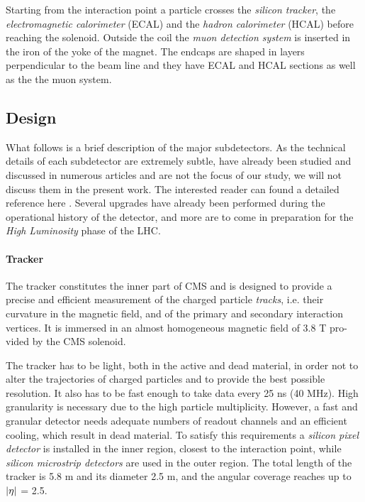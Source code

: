 Starting from the interaction point a particle crosses the\emph{ silicon tracker}, the \emph{electromagnetic calorimeter} (ECAL) and the \emph{hadron calorimeter} (HCAL) before reaching
the solenoid. Outside the coil the \emph{muon detection system} is inserted in the iron of the
yoke of the magnet. The endcaps are shaped in layers perpendicular to the beam
line and they have ECAL and HCAL sections as well as the the muon system.

\subsection{Design}

What follows is a brief description of the major subdetectors. As the technical details of each subdetector are extremely subtle, have already been studied and discussed in numerous articles and are not the focus of our study, we will not discuss them in the present work. The interested reader can found a detailed reference here \cite{Collaboration_2008}. Several upgrades have already been performed during the operational history of the detector, and more are to come in preparation for the \emph{High Luminosity} phase of the LHC.

\paragraph{Tracker}

The tracker constitutes the inner part of CMS and is designed to provide a precise
and efficient measurement of the charged particle \emph{tracks}, i.e. their curvature in the magnetic field, and of the primary and secondary
interaction vertices. It is immersed in an almost homogeneous magnetic field of 3.8 T pro-
vided by the CMS solenoid.

The tracker has to be light, both in the active and dead material, in order not to alter the
trajectories of charged particles and to provide the best possible resolution. It also has to
be fast enough to take data every 25 ns (40 MHz). High granularity is necessary due to the
high particle multiplicity. However, a fast and granular detector needs adequate numbers
of readout channels and an efficient cooling, which result in dead material.
To satisfy this requirements a \emph{silicon
pixel detector} is installed in the inner region, closest to the interaction point, while \emph{silicon
microstrip detectors} are used in the outer region. The total length of the tracker is 5.8 m
and its diameter 2.5 m, and the angular coverage reaches up to $\abs{\eta}$ = 2.5. 

